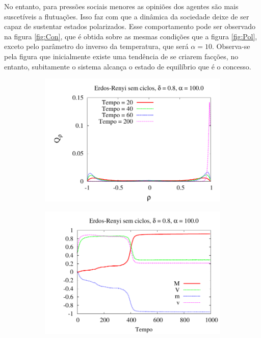 No entanto, para pressões sociais menores as opiniões dos agentes são mais
suscetíveis a flutuações. Isso faz com que a dinâmica da sociedade deixe
de ser capaz de sustentar estados polarizados. Esse comportamento pode ser
observado na figura \ref{fig:Con}, que é obtida sobre as mesmas condições
que a figura \ref{fig:Pol}, exceto pelo parâmetro do inverso da temperatura,
que será $\alpha = 10$. Observa-se pela figura que inicialmente existe uma
tendência de se criarem facções, no entanto, subitamente o sistema
alcança o estado de equilíbrio que é o concesso.

\begin{figure}
\centering
\begin{subfigure}[]{0.45\textwidth}
    \centering
    \includegraphics[width = \textwidth]{Figures/Histograma_Arvore}
    \caption{}
\end{subfigure}
\begin{subfigure}[]{0.45\textwidth}
   \centering 
    \includegraphics[width = \textwidth]{Figures/MagTempo_Arvore}

\end{subfigure}
\end{figure}
